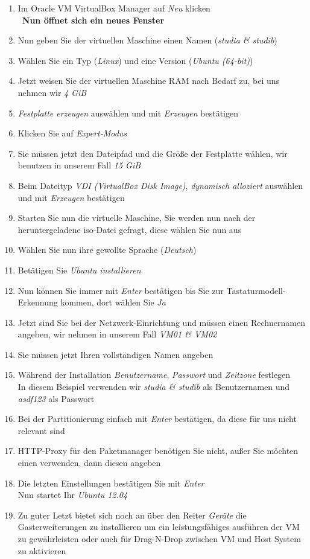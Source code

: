 \begin{enumerate}
	\item Im Oracle VM VirtualBox Manager auf \textit{Neu} klicken \\\
	\textbf{Nun öffnet sich ein neues Fenster} 
	\item Nun geben Sie der virtuellen Maschine einen Namen (\textit{studia \& studib})
	\item Wählen Sie ein Typ (\textit{Linux}) und eine Version (\textit{Ubuntu (64-bit)})
	\item Jetzt weisen Sie der virtuellen Maschine RAM nach Bedarf zu, bei uns nehmen wir \textit{4 GiB}
	\item \textit{Festplatte erzeugen} auswählen und mit \textit{Erzeugen} bestätigen
	\item Klicken Sie auf \textit{Expert-Modus}
	\item Sie müssen jetzt den Dateipfad und die Größe der Festplatte wählen, wir benutzen in unserem Fall \textit{15 GiB}
	\item Beim Dateityp \textit{VDI (VirtualBox Disk Image)},  \textit{dynamisch alloziert} auswählen und mit \textit{Erzeugen} bestätigen
	\item Starten Sie nun die virtuelle Maschine, Sie werden nun nach der heruntergeladene iso-Datei gefragt, diese wählen Sie nun aus 
	\item Wählen Sie nun ihre gewollte Sprache (\textit{Deutsch})
	\item Betätigen Sie \textit{Ubuntu installieren}
	\item Nun können Sie immer mit \textit{Enter} bestätigen bis Sie zur Tastaturmodell-Erkennung kommen, dort wählen Sie \textit{Ja}
	\item Jetzt sind Sie bei der Netzwerk-Einrichtung und müssen einen Rechnernamen angeben, wir nehmen in unserem Fall \textit{VM01 \& VM02}
	\item Sie müssen jetzt Ihren vollständigen Namen angeben
	\item Während der Installation \textit{Benutzername}, \textit{Passwort} und \textit{Zeitzone} festlegen \\
	In diesem Beispiel verwenden wir \textit{studia \& studib} als Benutzernamen und \textit{asdf123} als Passwort
	\item Bei der Partitionierung einfach mit \textit{Enter} bestätigen, da diese für uns nicht relevant sind
	\item HTTP-Proxy für den Paketmanager benötigen Sie nicht, außer Sie möchten einen verwenden, dann diesen angeben 
	\item Die letzten Einstellungen bestätigen Sie mit \textit{Enter} \\
	Nun startet Ihr \textit{Ubuntu 12.04}
	\item Zu guter Letzt bietet sich noch an über den Reiter \textit{Geräte} die Gasterweiterungen zu installieren um ein leistungsfähiges ausführen der VM zu gewährleisten oder auch für Drag-N-Drop zwischen VM und Host System zu aktivieren
\end{enumerate}

